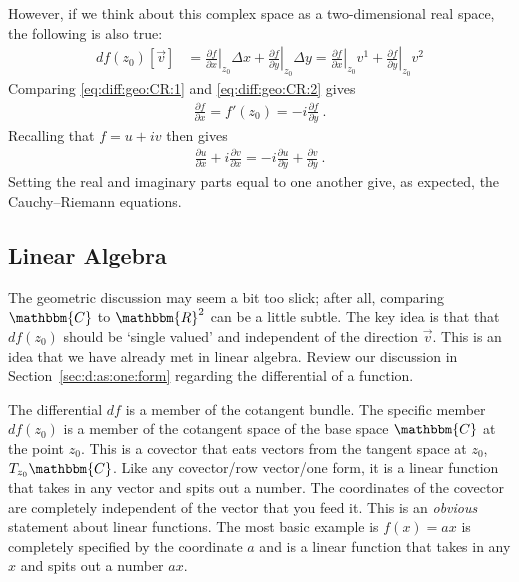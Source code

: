 \documentclass[
  11pt,
	colorful,
	raggedright,
]{tufte-style-thesis-flip}
\begin{document}
However, if we think about this complex space as a two-dimensional real space, the following is also true:
\begin{align}
  df(z_0)\left[\vec{v}\right] &=
  \left.\frac{\partial f}{\partial x}\right|_{z_0} \Delta x
  +
  \left.\frac{\partial f}{\partial y}\right|_{z_0} \Delta y
  =
  \left.\frac{\partial f}{\partial x}\right|_{z_0} v^1
  +
  \left.\frac{\partial f}{\partial y}\right|_{z_0} v^2
  \label{eq:diff:geo:CR:2}
\end{align}
Comparing \eqref{eq:diff:geo:CR:1} and \eqref{eq:diff:geo:CR:2} gives 
\begin{align}
  \frac{\partial f}{\partial x} = f'(z_0) = - i\frac{\partial f}{\partial y} \ .
\end{align}
Recalling that $f= u+iv$ then gives
\begin{align}
  \frac{\partial u}{\partial x}
  + i
  \frac{\partial v}{\partial x}
  =
  -i
  \frac{\partial u}{\partial y}
  +
  \frac{\partial v}{\partial y} \ .
\end{align}
Setting the real and imaginary parts equal to one another give, as expected, the Cauchy--Riemann equations. 

\subsection{Linear Algebra}

The geometric discussion may seem a bit too slick; after all, comparing $\mathbbm{C}$ to $\mathbbm{R}^2$ can be a little subtle.  The key idea is that that $df(z_0)$ should be `single valued' and independent of the direction $\vec{v}$. This is an idea that we have already met in linear algebra. Review our discussion in Section~\eqref{sec:d:as:one:form} regarding the differential of a function. 

The differential $df$ is a member of the cotangent bundle. The specific member $df(z_0)$ is a member of the cotangent space of the base space $\mathbbm{C}$ at the point $z_0$. This is a covector that eats vectors from the tangent space at $z_0$, $T_{z_0}\mathbbm{C}$. Like any covector/row vector/one form, it is a linear function that takes in any vector and spits out a number. The coordinates of the covector are completely independent of the vector that you feed it. This is an \emph{obvious} statement about linear functions. The most basic example is $f(x)=ax$ is completely specified by the coordinate $a$ and is a linear function that takes in any $x$ and spits out a number $ax$. 
\end{document}
